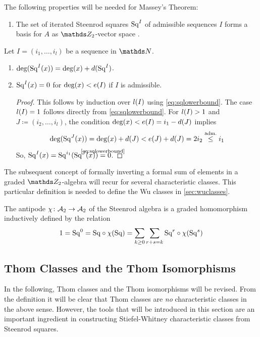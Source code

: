 \begin{Rem}\label{rem:sq}
  The following properties will be needed for Massey's Theorem:
  \begin{enumerate}
  \item The set of iterated Steenrod squares $\mathrm{Sq}^{I}$ of admissible
    sequences $I$ forms a basis for $A$ as $\Zmod2$-vector space
    \cite[Chap.~6, Theorem~1]{mosher}.
  \end{enumerate}
  Let $I=(i_1,\dotsc,i_l)$ be a sequence in $\Nat$.
  \begin{enumerate}[resume*]
  \item $\deg(\mathrm{Sq}^{I}(x)) = \deg(x) + d(\mathrm{Sq}^{I})$.
  \item\label{item:squpperboundgeneral} $\mathrm{Sq}^{I}(x) = 0$ for  $\deg(x)<e(I)$ if $I$ is admissible.
    \begin{proof}
      This follows by induction over $l(I)$ using
      \eqref{eq:sqlowerbound}. The case $l(I)=1$ follows directly 
      from \eqref{eq:sqlowerbound}.
      For $l(I)>1$ and $J\coloneqq(i_2,\dotsc,i_l)$, the condition
      $\deg(x) < e(I)=i_1-d(J)$
      implies
      \begin{gather*}
        \deg(\mathrm{Sq}^{J}(x))
        = \deg(x)+d(J) < e(J)+d(J) = 2i_2
        \overset{\text{adm.}}\leq i_1
      \end{gather*}
      So,
      $\Sq I(x)=\Sq{i_1}(\Sq J(x)) \cequalsby{\eqref{eq:sqlowerbound}} 0$.
    \end{proof}
  \end{enumerate}
\end{Rem}

The subsequent concept of formally inverting a formal sum of elements
in a graded $\Zmod2$-algebra will recur for several characteristic
classes. This particular definition is needed to define the Wu classes
in \autoref{sec:wuclasses}. 
\begin{Def}\label{def:antipode}
  The antipode $\chi\colon \mathcal{A}_2\to\mathcal{A}_2$ of the Steenrod algebra is a
  graded homomorphism inductively defined by the relation
  \begin{gather*}
    1 = \mathrm{Sq}^{0}
    = \mathrm{Sq} \circ \chi(\mathrm{Sq})
    = \sum_{k\geq0}\sum_{r+s=k} \mathrm{Sq}^{r} \circ \chi(\mathrm{Sq}^{s})
  \end{gather*}
\end{Def}


\subsection{Thom Classes and the Thom Isomorphisms}\label{sec:thomclasses}
In the following, Thom classes and the Thom isomorphisms will be
revised. From the definition it will be clear that Thom classes are
\emph{no} characteristic classes in the above sense. However, the
tools that will be introduced in this section are an important
ingredient in constructing Stiefel-Whitney characteristic classes from
Steenrod squares.

